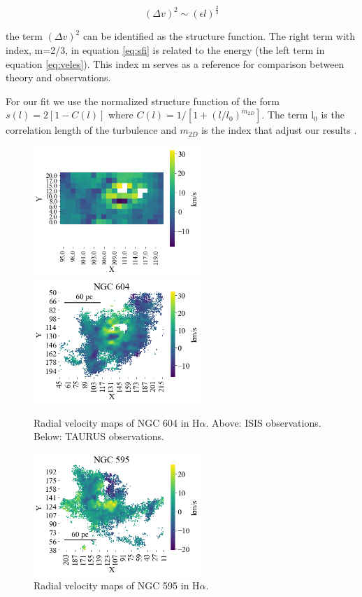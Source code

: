 \documentclass[fleqn,usenatbib]{mnras}
\begin{document}
\begin{equation}\label{eq:sfi}
(\Delta v)^{2} \sim (\epsilon l)^{\frac{2}{3}}
\end{equation}

the term $(\Delta v)^{2}$ can be identified as the structure function. The right term with index,  m=2/3, in equation \ref{eq:sfi} is related to the energy (the left term in equation \ref{eq:veles}). This index m serves as a reference for comparison between theory and observations.

For our fit we use the normalized structure function of the form $s(l)=2[1-C(l)]$ where $C(l)=1/[1+(l/l_{0})^{m_{2D}}]$. The term l$_{0}$ is the correlation length of the turbulence and $m_{2D}$ is the index that adjust our results \citep{1984ApJ...277..556S, arthur2016turbulence}.

\begin{figure}
\centering 
\includegraphics[width=2.5in]{Figures/6ISIS.png}
\includegraphics[width=2.5in]{Figures/M6T}
\caption{Radial velocity maps of NGC 604 in H$\alpha$. Above: ISIS observations. Below: TAURUS observations. }
\label{fig:M604}
\end{figure}

\begin{figure}
\centering 
\includegraphics[width=2.5in]{Figures/M5T.png}
\caption{Radial velocity maps of NGC 595 in H$\alpha$.}
\label{fig:M595}
\end{figure}
\end{document}
